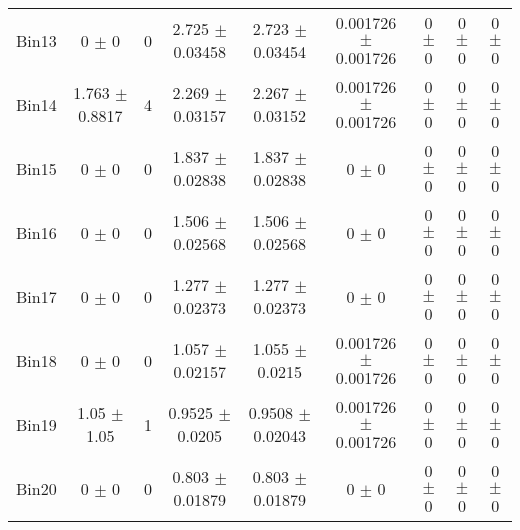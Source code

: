 \begin{tabular}{@{\extracolsep{4pt}}lcccccccc@{}}
     Bin13 & 0 $\pm$ 0 & 0 & 2.725 $\pm$ 0.03458 & 2.723 $\pm$ 0.03454 & 0.001726 $\pm$ 0.001726 & 0 $\pm$ 0 & 0 $\pm$ 0 & 0 $\pm$ 0 \\ 
     Bin14 & 1.763 $\pm$ 0.8817 & 4 & 2.269 $\pm$ 0.03157 & 2.267 $\pm$ 0.03152 & 0.001726 $\pm$ 0.001726 & 0 $\pm$ 0 & 0 $\pm$ 0 & 0 $\pm$ 0 \\ 
     Bin15 & 0 $\pm$ 0 & 0 & 1.837 $\pm$ 0.02838 & 1.837 $\pm$ 0.02838 & 0 $\pm$ 0 & 0 $\pm$ 0 & 0 $\pm$ 0 & 0 $\pm$ 0 \\ 
     Bin16 & 0 $\pm$ 0 & 0 & 1.506 $\pm$ 0.02568 & 1.506 $\pm$ 0.02568 & 0 $\pm$ 0 & 0 $\pm$ 0 & 0 $\pm$ 0 & 0 $\pm$ 0 \\ 
     Bin17 & 0 $\pm$ 0 & 0 & 1.277 $\pm$ 0.02373 & 1.277 $\pm$ 0.02373 & 0 $\pm$ 0 & 0 $\pm$ 0 & 0 $\pm$ 0 & 0 $\pm$ 0 \\ 
     Bin18 & 0 $\pm$ 0 & 0 & 1.057 $\pm$ 0.02157 & 1.055 $\pm$ 0.0215 & 0.001726 $\pm$ 0.001726 & 0 $\pm$ 0 & 0 $\pm$ 0 & 0 $\pm$ 0 \\ 
     Bin19 & 1.05 $\pm$ 1.05 & 1 & 0.9525 $\pm$ 0.0205 & 0.9508 $\pm$ 0.02043 & 0.001726 $\pm$ 0.001726 & 0 $\pm$ 0 & 0 $\pm$ 0 & 0 $\pm$ 0 \\ 
     Bin20 & 0 $\pm$ 0 & 0 & 0.803 $\pm$ 0.01879 & 0.803 $\pm$ 0.01879 & 0 $\pm$ 0 & 0 $\pm$ 0 & 0 $\pm$ 0 & 0 $\pm$ 0 \\ 
\hline\hline
  \end{tabular}
